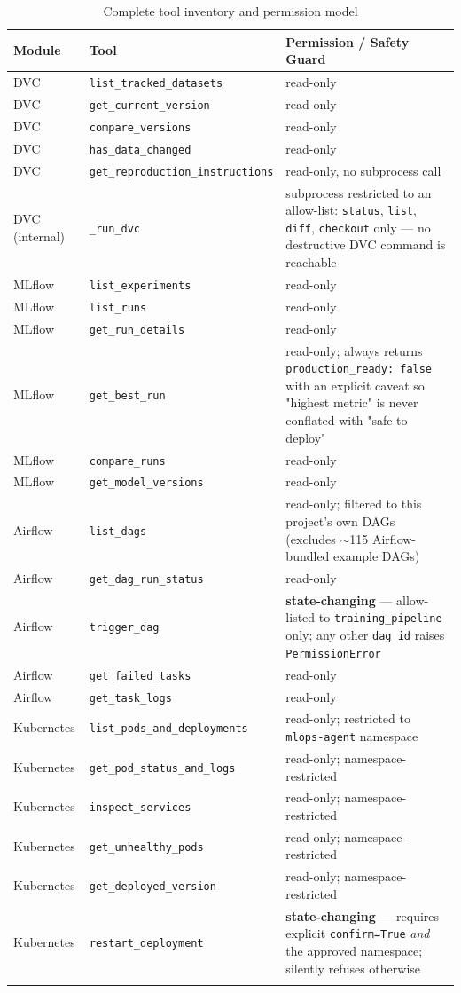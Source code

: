 \documentclass[11pt,a4paper]{article}
\begin{document}
\begin{longtable}{p{2.1cm}p{4.3cm}p{7cm}}
\toprule
\textbf{Module} & \textbf{Tool} & \textbf{Permission / Safety Guard} \\
\midrule
\endhead
DVC & \texttt{list\_tracked\_datasets} & read-only \\
DVC & \texttt{get\_current\_version} & read-only \\
DVC & \texttt{compare\_versions} & read-only \\
DVC & \texttt{has\_data\_changed} & read-only \\
DVC & \texttt{get\_reproduction\_instructions} & read-only, no subprocess call \\
DVC (internal) & \texttt{\_run\_dvc} & subprocess restricted to an allow-list: \texttt{status}, \texttt{list}, \texttt{diff}, \texttt{checkout} only --- no destructive DVC command is reachable \\
\midrule
MLflow & \texttt{list\_experiments} & read-only \\
MLflow & \texttt{list\_runs} & read-only \\
MLflow & \texttt{get\_run\_details} & read-only \\
MLflow & \texttt{get\_best\_run} & read-only; always returns \texttt{production\_ready: false} with an explicit caveat so "highest metric" is never conflated with "safe to deploy" \\
MLflow & \texttt{compare\_runs} & read-only \\
MLflow & \texttt{get\_model\_versions} & read-only \\
\midrule
Airflow & \texttt{list\_dags} & read-only; filtered to this project's own DAGs (excludes $\sim$115 Airflow-bundled example DAGs) \\
Airflow & \texttt{get\_dag\_run\_status} & read-only \\
Airflow & \texttt{trigger\_dag} & \textbf{state-changing} --- allow-listed to \texttt{training\_pipeline} only; any other \texttt{dag\_id} raises \texttt{PermissionError} \\
Airflow & \texttt{get\_failed\_tasks} & read-only \\
Airflow & \texttt{get\_task\_logs} & read-only \\
\midrule
Kubernetes & \texttt{list\_pods\_and\_deployments} & read-only; restricted to \texttt{mlops-agent} namespace \\
Kubernetes & \texttt{get\_pod\_status\_and\_logs} & read-only; namespace-restricted \\
Kubernetes & \texttt{inspect\_services} & read-only; namespace-restricted \\
Kubernetes & \texttt{get\_unhealthy\_pods} & read-only; namespace-restricted \\
Kubernetes & \texttt{get\_deployed\_version} & read-only; namespace-restricted \\
Kubernetes & \texttt{restart\_deployment} & \textbf{state-changing} --- requires explicit \texttt{confirm=True} \emph{and} the approved namespace; silently refuses otherwise \\
\bottomrule
\caption{Complete tool inventory and permission model}
\label{tab:tools}
\end{longtable}
\end{document}
